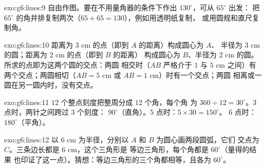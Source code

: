 \begin{solution}{exo:g6:lines:9}
自由作图。要在不用量角器的条件下作出 $130^\circ$，可从 $65^\circ$ 出发：
把 $65^\circ$ 的角并排复制两次（$65 + 65 =
130$），例如用透明纸复制，
或用圆规和直尺复制角。
\end{solution}

\begin{solution}{exo:g6:lines:10}
距离为 $3$ cm 的点（即到 $A$ 的距离）构成圆心为 $A$、
半径为 $3$ cm 的圆；距离为 $2$ cm 的点（即到 $B$ 的距离）
构成圆心为 $B$、半径为 $2$ cm 的圆。所求的点即为这两个圆的交点：两圆
相交时（$AB$ 严格介于 $1$ 与
$5$ cm 之间）有两个交点；两圆相切（$AB = 5$ cm 或 $AB = 1$ cm）时有一个交点；两圆
相离或一圆在另一圆内时，没有交点。
\end{solution}

\begin{solution}{exo:g6:lines:11}
$12$ 个整点刻度把整周分成 $12$ 个角，每个角
为 $360 \div 12 = 30^\circ$。3 点时，两针之间跨过 $3$ 个刻度：
$90^\circ$（直角）。5 点时：$5 \times 30 = 150^\circ$。
6 点时：$180^\circ$（平角）。
\end{solution}

\begin{solution}{exo:g6:lines:12}
以 $6$ cm 为半径，分别以 $A$ 和 $B$ 为圆心画两段圆弧，它们
交点为 $C$。三条边长都是 $6$ cm，这个三角形是
等边三角形，每个角都是 $60^\circ$（量得的结果
也印证了这一点）。猜想：等边三角形的三个角都相等，且各为
$60^\circ$。
\end{solution}

